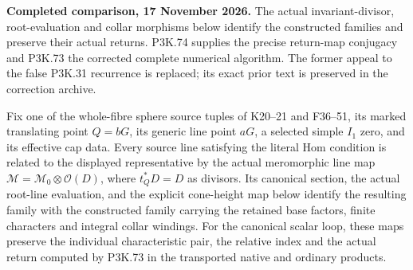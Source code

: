 \begin{theorem}\label{night:P3F.52}
\par\noindent\textbf{Completed comparison, 17 November 2026.}
The actual invariant-divisor, root-evaluation and collar morphisms
below identify the constructed families and preserve their actual
returns. P3K.74 supplies the precise return-map conjugacy and
P3K.73 the corrected complete numerical algorithm. The former
appeal to the false P3K.31 recurrence is replaced; its exact prior
text is preserved in the correction archive.
\medskip


Fix one of the whole-fibre sphere source tuples of K20--21 and
F36--51, its marked translating point \(Q=bG\), its generic line
point \(aG\), a selected simple \(I_1\) zero, and its effective
cap data. Every source line satisfying the literal Hom condition
is related to the displayed representative by the actual
meromorphic line map \(\mathcal M=\mathcal M_0\otimes\mathcal O(D)\),
where \(t_Q^*D=D\) as divisors.
Its canonical section, the actual root-line evaluation, and the
explicit cone-height map below identify the resulting family
with the constructed family carrying the retained base factors,
finite characters and integral collar windings.
For the canonical scalar loop, these maps preserve the individual
characteristic pair, the relative index and the actual return
computed by P3K.73 in the transported native and ordinary products.
\end{theorem}
